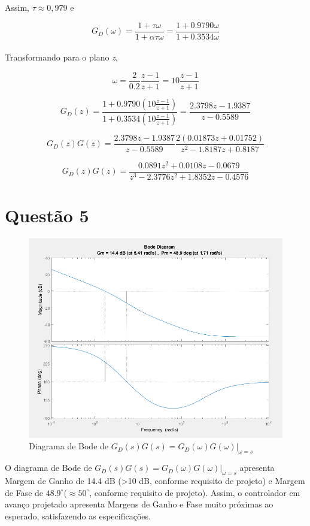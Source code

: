 \documentclass{article}
\begin{document}
    {Assim, $ \tau \approx 0,979 $ e}

    $$ G_{D}(\omega) = \frac{ 1+\tau\omega }{ 1+\alpha\tau\omega } = \frac{ 1 + 0.9790\omega }{ 1 + 0.3534\omega } $$\\[0.2cm]

    {Transformando para o plano \textit{z},}

    $$ \omega = \frac{2}{0.2} \frac{z-1}{z+1} = 10\frac{z-1}{z+1} $$

    $$ G_{D}(z) = \frac{ 1 + 0.9790 \left( 10\frac{z-1}{z+1} \right) }{ 1 + 0.3534 \left( 10\frac{z-1}{z+1} \right) } = \frac{ 2.3798z - 1.9387 }{ z - 0.5589 } $$

    $$ G_{D}(z)G(z) = \frac{ 2.3798z - 1.9387 }{ z - 0.5589 } \frac{ 2(0.01873z + 0.01752) }{ z^{2}-1.8187z+0.8187 } $$

    $$ G_{D}(z)G(z) = \frac{ 0.0891z^2 +0.0108z -0.0679 }{ z^3 -2.3776z^2 +1.8352z -0.4576 } $$

\section*{Questão 5}
    \begin{figure}[H]
       \centering
            \includegraphics[width=1\linewidth]{images/bodeGdG.png}
            \caption{Diagrama de Bode de $ G_{D}(s)G(s) = G_{D}(\omega)G(\omega)|_{\omega=s} $}
            \label{fig:bodeGdG}
    \end{figure}

    {O diagrama de Bode de $ G_{D}(s)G(s) = G_{D}(\omega)G(\omega)|_{\omega=s} $ apresenta Margem de Ganho de 14.4 dB (>10 dB, conforme requisito de projeto) e Margem de Fase de $ 48.9 ^{\circ} $($     \approx 50 ^{\circ} $, conforme requisito de projeto). Assim, o controlador em avanço projetado apresenta Margens de Ganho e Fase muito próximas ao esperado, satisfazendo as especificações.}
\end{document}

